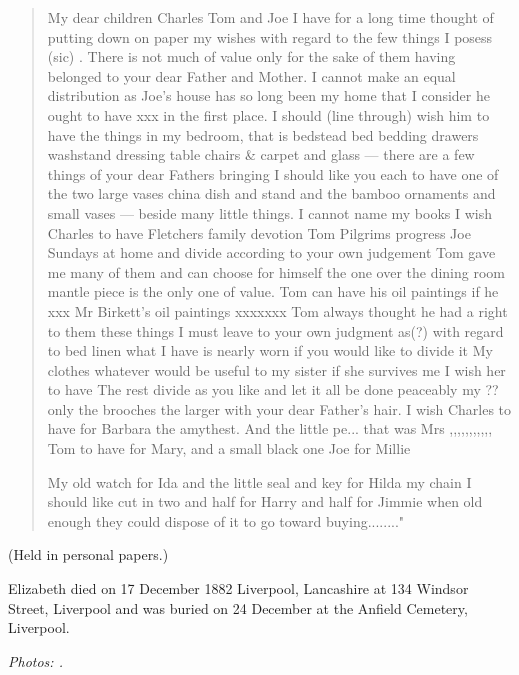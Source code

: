 \begin{quotation}
My dear children Charles Tom and Joe I have for a long time thought of putting down on paper my wishes with regard to the few things I posess (sic) . There is not much of value only for the sake of them having belonged to your dear Father and Mother. I cannot make an equal distribution as Joe’s house has so long been my home that I consider he ought to have xxx in the first place. I should (line through) wish him to have the things in my bedroom, that is bedstead bed bedding drawers washstand dressing table chairs \& carpet and glass --- there are a few things of your dear Fathers bringing I should like you each to have one of the two large vases china dish and stand and the bamboo ornaments and small vases --- beside many little things. I cannot name my books I wish Charles to have Fletchers family devotion Tom Pilgrims progress Joe Sundays at home and divide according to your own judgement Tom gave me many of them and can choose for himself the one over the dining room mantle piece is the only one of value. Tom can have his oil paintings if he xxx Mr Birkett’s oil paintings xxxxxxx Tom always thought he had a right to them these things I must leave to your own judgment as(?) with regard to bed linen what I have is nearly worn if you would like to divide it My clothes whatever would be useful to my sister if she survives me I wish her to have The rest divide as you like and let it all be done peaceably my ?? only the brooches the larger with your dear Father’s hair. I wish Charles to have for Barbara the amythest. And the little pe... that was Mrs ,,,,,,,,,,, Tom to have for Mary, and a small black one Joe for Millie

My old watch for Ida and the little seal and key for Hilda my chain I should like cut in two and half for Harry and half for Jimmie when old enough they could dispose of it to go toward buying........"
\end{quotation}

(Held in personal papers.)

Elizabeth died on 17 December 1882 Liverpool, Lancashire at 134 Windsor Street, Liverpool and was buried on 24 December at the Anfield Cemetery, Liverpool. \cite{EHazelwoodDeath}

\emph{Photos: .}
